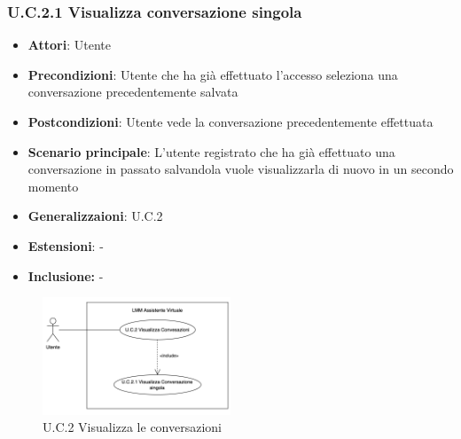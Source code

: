 \subsubsection{U.C.2.1 Visualizza conversazione singola}
\begin{itemize}
    \item \textbf{Attori}: Utente
    \item \textbf{Precondizioni}: Utente che ha già effettuato l’accesso seleziona una conversazione precedentemente salvata
    \item \textbf{Postcondizioni}: Utente vede la conversazione precedentemente effettuata
    \item \textbf{Scenario principale}: L’utente registrato che ha già effettuato una conversazione in passato salvandola vuole visualizzarla di nuovo in un secondo momento
    \item \textbf{Generalizzaioni}: U.C.2
    \item \textbf{Estensioni}: -
    \item \textbf{Inclusione:} -
\end{itemize}
\begin{figure}[h!]
    \centering
    \includegraphics[width=0.5\textwidth]{img/UC2-1.png}
    \caption{U.C.2 Visualizza le conversazioni}
\end{figure}